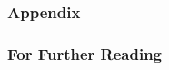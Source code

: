 \documentclass[
  en, %
  inputenc=utf8,
]{tuhhslides}
\begin{document}
\begin{frame}
  \vcardpage
\end{frame}


\backup

\begin{frame}
  \frametitle{Appendix}
\end{frame}


\begin{frame}
  \frametitle{For Further Reading}
\end{frame}
\end{document}
